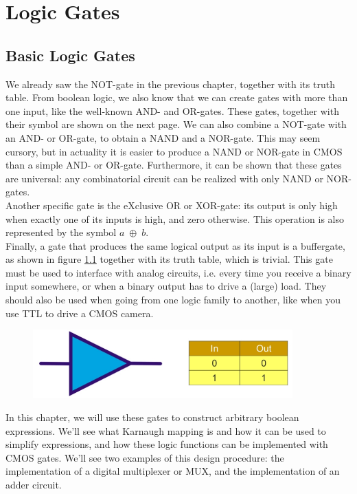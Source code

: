 \chapter{Logic Gates}
\label{ch:logic_gates}
\section{Basic Logic Gates}

We already saw the NOT-gate in the previous chapter, together with its truth table. From boolean logic, we also know that we can create gates with more than one input, like the well-known AND- and OR-gates. These gates, together with their symbol are shown on the next page. We can also combine a NOT-gate with an AND- or OR-gate, to obtain a NAND and a NOR-gate. This may seem cursory, but in actuality it is easier to produce a NAND or NOR-gate in CMOS than a simple AND- or OR-gate. Furthermore, it can be shown that these gates are universal: any combinatorial circuit can be realized with only NAND or NOR-gates.\\
Another specific gate is the eXclusive OR or XOR-gate: its output is only high when exactly one of its inputs is high, and zero otherwise. This operation is also represented by the symbol $a \; \oplus  \;  b $.\\
Finally, a gate that produces the same logical output as its input is a buffergate, as shown in figure \ref{fig:buffer_gate} together with its truth table, which is trivial. This gate must be used to interface with analog circuits, i.e. every time you receive a binary input somewhere, or when a binary output has to drive a (large) load. They should also be used when going from one logic family to another, like when you use TTL to drive a CMOS camera.

\begin{figure}[h!]
	\centering
	\includegraphics[width=10cm]{figures/ch13/buffer_gate.jpg}
	\caption{}
	\label{fig:buffer_gate}
\end{figure}

In this chapter, we will use these gates to construct arbitrary boolean expressions. We'll see what Karnaugh mapping is and how it can be used to simplify expressions, and how these logic functions can be implemented with CMOS gates. We'll see two examples of this design procedure: the implementation of a digital multiplexer or MUX, and the implementation of an adder circuit.


